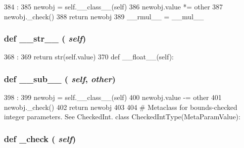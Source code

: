 \begin{DoxyCode}
384                             :
385         newobj = self.__class__(self)
386         newobj.value *= other
387         newobj._check()
388         return newobj
389 
    __rmul__ = __mul__
\end{DoxyCode}
\hypertarget{classm5_1_1params_1_1NumericParamValue_aa7a4b9bc0941308e362738503137460e}{
\subsubsection[{\_\-\_\-str\_\-\_\-}]{\setlength{\rightskip}{0pt plus 5cm}def \_\-\_\-str\_\-\_\- ( {\em self})}}
\label{classm5_1_1params_1_1NumericParamValue_aa7a4b9bc0941308e362738503137460e}



\begin{DoxyCode}
368                      :
369         return str(self.value)
370 
    def __float__(self):
\end{DoxyCode}
\hypertarget{classm5_1_1params_1_1NumericParamValue_a92f51217c100657d0bf6f97b150c0a7c}{
\subsubsection[{\_\-\_\-sub\_\-\_\-}]{\setlength{\rightskip}{0pt plus 5cm}def \_\-\_\-sub\_\-\_\- ( {\em self}, \/   {\em other})}}
\label{classm5_1_1params_1_1NumericParamValue_a92f51217c100657d0bf6f97b150c0a7c}



\begin{DoxyCode}
398                             :
399         newobj = self.__class__(self)
400         newobj.value -= other
401         newobj._check()
402         return newobj
403 
404 # Metaclass for bounds-checked integer parameters.  See CheckedInt.
class CheckedIntType(MetaParamValue):
\end{DoxyCode}
\hypertarget{classm5_1_1params_1_1NumericParamValue_a5c5703e7ec69bc87b19ba3165760ea36}{
\subsubsection[{\_\-check}]{\setlength{\rightskip}{0pt plus 5cm}def \_\-check ( {\em self})}}
\label{classm5_1_1params_1_1NumericParamValue_a5c5703e7ec69bc87b19ba3165760ea36}


